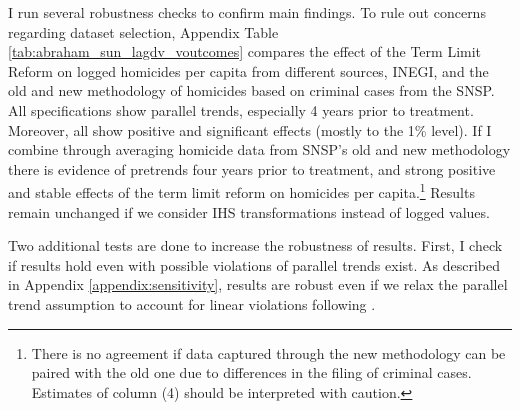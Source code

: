 \documentclass[12pt]{amsart}
\numberwithin{equation}{section}
\theoremstyle{definition}
\theoremstyle{definition}
\theoremstyle{definition}
\begin{document}
I run several robustness checks to confirm main findings. %
To rule out concerns regarding dataset selection, Appendix Table \ref{tab:abraham_sun_lagdv_voutcomes} compares the effect of the Term Limit Reform on logged homicides per capita from different sources, INEGI, and the old and new methodology of homicides based on criminal cases from the SNSP. All specifications show parallel trends, especially 4 years prior to treatment. Moreover, all show positive and significant effects (mostly to the 1\% level). If I combine through averaging homicide data from SNSP's old and new methodology there is evidence of pretrends four years prior to treatment, and strong positive and stable effects of the term limit reform on homicides per capita.\footnote{There is no agreement if data captured through the new methodology can be paired with the old one due to differences in the filing of criminal cases. Estimates of column (4) should be interpreted with caution.} Results remain unchanged if we consider IHS transformations instead of logged values. 

Two additional tests are done to increase the robustness of results. First, I check if results hold even with possible violations of parallel trends exist. As described in Appendix \ref{appendix:sensitivity}, results are robust even if we relax the parallel trend assumption to account for linear violations following \citet{rambachan_roth_2019}. 
  
 
\end{document}
